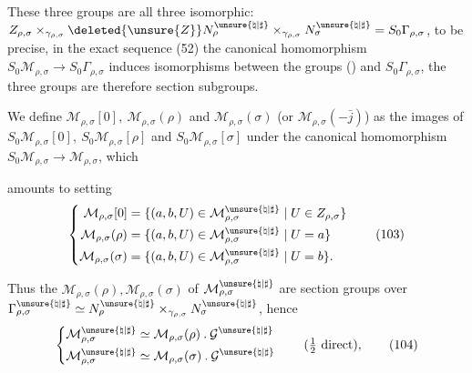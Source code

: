 These three groups are  all three isomorphic:
$Z_{\rho,\sigma}\times_{\gamma_{\rho,\sigma}}
\deleted{\unsure{Z}}N_\rho^{\unsure{\natural|\sharp}}\times_{\gamma_{\rho,\sigma}}
N_\sigma^{\unsure{\natural|\sharp}}=S_0\Gamma_{\rho,\sigma}$,
to be precise, in the exact sequence (52)
the canonical homomorphism
$S_0\mathcal{M}_{\rho,\sigma}\longrightarrow S_0\Gamma_{\rho,\sigma}$
induces isomorphisms between the groups () and $S_0\Gamma_{\rho,\sigma}$, the three groups are therefore section subgroups.

We define $\mathcal{M}_{\rho,\sigma}[0],\ \mathcal{M}_{\rho,\sigma}(\rho)$
and $\mathcal{M}_{\rho,\sigma}(\sigma)$ (or $\mathcal{M}_{\rho,\sigma}(-\bar{j})$) as the images of
$S_0\mathcal{M}_{\rho,\sigma}[0],\ S_0\mathcal{M}_{\rho,\sigma}[\rho]$ and
$S_0\mathcal{M}_{\rho,\sigma}[\sigma]$ under the canonical homomorphism
$S_0\mathcal{M}_{\rho,\sigma}\longrightarrow\mathcal{M}_{\rho,\sigma}$, which




amounts to setting
\[
\left\{\begin{aligned}
\mathcal{M}_{\rho,\sigma}[0]
&=\{(a,b,U)\in\mathcal{M}_{\rho,\sigma}^{\unsure{\natural|\sharp}}\mid U\in Z_{\rho,\sigma}\}\\
\mathcal{M}_{\rho,\sigma}(\rho)
&=\{(a,b,U)\in\mathcal{M}_{\rho,\sigma}^{\unsure{\natural|\sharp}}\mid U=a\}\\
\mathcal{M}_{\rho,\sigma}(\sigma)
&=\{(a,b,U)\in\mathcal{M}_{\rho,\sigma}^{\unsure{\natural|\sharp}}\mid U=b\}.
\end{aligned}\right.
\tag{103}
\]

Thus the  $\mathcal{M}_{\rho,\sigma}(\rho),\mathcal{M}_{\rho,\sigma}(\sigma)$ of $\mathcal{M}_{\rho,\sigma}^{\unsure{\natural|\sharp}}$ are section groups over $\Gamma_{\rho,\sigma}^{\unsure{\natural|\sharp}}\simeq N_\rho^{\unsure{\natural|\sharp}}\mathbin{\times}_{\gamma_{\rho,\sigma}}N_\sigma^{\unsure{\natural|\sharp}}$, hence
\[
\left\{\begin{aligned}
\mathcal{M}_{\rho,\sigma}^{\unsure{\natural|\sharp}}
&\simeq\mathcal{M}_{\rho,\sigma}(\rho)\mathbin{.}\mathcal{G}^{\unsure{\natural|\sharp}}\\
\mathcal{M}_{\rho,\sigma}^{\unsure{\natural|\sharp}}
&\simeq\mathcal{M}_{\rho,\sigma}(\sigma)\mathbin{.}\mathcal{G}^{\unsure{\natural|\sharp}}
\end{aligned}\right.
\qquad(\tfrac12\ \text{direct}),
\tag{104}
\]

